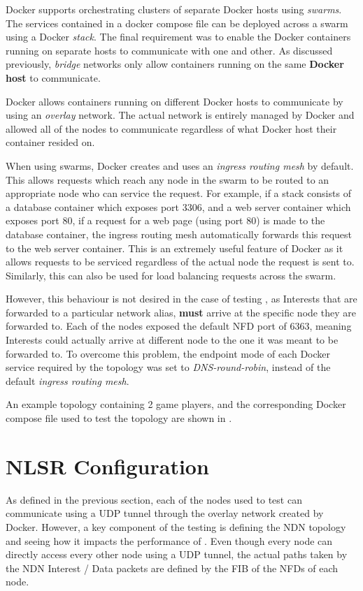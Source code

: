 Docker supports orchestrating clusters of separate Docker hosts using \textit{swarms}. The services contained in a docker compose file can be deployed across a swarm using a Docker \textit{stack}. The final requirement was to enable the Docker containers running on separate hosts to communicate with one and other. As discussed previously, \textit{bridge} networks only allow containers running on the same \textbf{Docker host} to communicate.

Docker allows containers running on different Docker hosts to communicate by using an \textit{overlay} network. The actual network is entirely managed by Docker and allowed all of the \game{} nodes to communicate regardless of what Docker host their container resided on. 

When using swarms, Docker creates and uses an \textit{ingress routing mesh} by default. This allows requests which reach any node in the swarm to be routed to an appropriate node who can service the request. For example, if a stack consists of a database container which exposes port 3306, and a web server container which exposes port 80, if a request for a web page (using port 80) is made to the database container, the ingress routing mesh automatically forwards this request to the web server container. This is an extremely useful feature of Docker as it allows requests to be serviced regardless of the actual node the request is sent to. Similarly, this can also be used for load balancing requests across the swarm.

However, this behaviour is not desired in the case of testing \game{}, as Interests that are forwarded to a particular network alias, \textbf{must} arrive at the specific node they are forwarded to. Each of the nodes exposed the default NFD port of 6363, meaning Interests could actually arrive at different node to the one it was meant to be forwarded to. To overcome this problem, the endpoint mode of each Docker service required by the topology was set to \textit{DNS-round-robin}, instead of the default \textit{ingress routing mesh}.

An example topology containing 2 game players, and the corresponding Docker compose file used to test the topology are shown in .



\section{NLSR Configuration}\label{sec:impl:topologies}
As defined in the previous section, each of the nodes used to test \game{} can communicate using a UDP tunnel through the overlay network created by Docker. However, a key component of the testing is defining the NDN topology and seeing how it impacts the performance of \game{}. Even though every node can directly access every other node using a UDP tunnel, the actual paths taken by the NDN Interest / Data packets are defined by the FIB of the NFDs of each node. 

